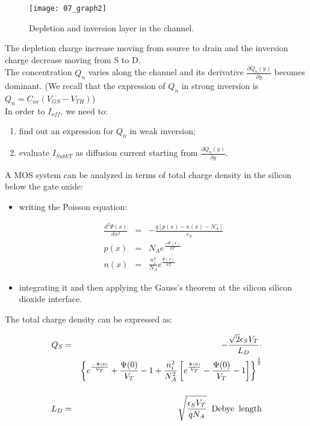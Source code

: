 \documentclass[a4paper, 12pt, twoside, openright]{report}
\begin{document}
	\begin{figure}[H]
	\centering
	\texttt{[image: 07\_graph2]}
	\caption{Depletion and inversion layer in the channel.}
	\label{}
	\end{figure}

The depletion charge increase moving from source to drain and the inversion charge decrease moving from S to D.\\
The concentration $Q_{n}$ varies along the channel and its derivative $\frac{\partial Q_n (y)}{\partial y}$ becomes dominant.
(We recall that the expression of $Q_{n}$ in strong inversion is $Q_{n} = C_{ox} (V_{GS} - V_{TH})$)\\
In order to  $I_{off}$, we need to:

\begin{enumerate}
\item find out an expression for $Q_{n}$ in weak inversion;
\item evaluate $I_{SubVT}$ as diffusion current starting from $\frac{\partial Q_n (y)}{\partial y}$.
\end{enumerate}

A MOS system can be analyzed in terms of total charge density in the silicon below the gate oxide:

\begin{itemize}
\item writing the Poisson equation:
	
	\begin{eqnarray*}
	\frac{d^2  {\Psi(x)}}{dx^2} &=& -\frac{q \left[ p(x)-n(x)-N_A^- \right]}{\epsilon_S}\\[1ex]
	p(x)&=&N_A e^{\displaystyle\frac{- {\Psi(x)}}{kT}}\\[2ex]
	n(x)&=&\frac{n_i^2}{N_A}e^{\displaystyle\frac{ {\Psi(x)}}{kT}}
	\end{eqnarray*}

\item integrating it and then applying the Gauss’s theorem at the silicon silicon dioxide interface.
\end{itemize}

The total charge density can be expressed as:

    \begin{eqnarray*}
      Q_S&=&-\frac{\sqrt{2} \epsilon_S V_T}{L_D}\cdot \\
         & &\displaystyle\left\{e^{\frac{-\Psi(0)}{V_T}}+ {\frac{\Psi(0)}{V_T}}-1+
             \frac{n_i^2}{N_A^2}\left[\displaystyle {e^{ \frac{\Psi(0)}{V_T}}} -
             \frac{\Psi(0)}{V_T}-1\right]\right\}^{\frac{1}{2}}\\[3ex]
       L_D&=& \sqrt{\frac{\epsilon_S V_T}{qN_A}}\;\; \rm{Debye\;\;length}
    \end{eqnarray*}
\end{document}
